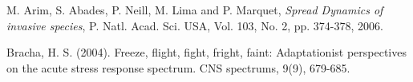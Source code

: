 \documentclass[10pt]{amsart}
\theoremstyle{definition}
\begin{document}
\begin{thebibliography}{}



M. Arim, S. Abades, P. Neill, M. Lima and P. Marquet,
\newblock \emph{Spread Dynamics of invasive species},
\newblock P. Natl. Acad. Sci. USA,
\newblock Vol. 103, No. 2, pp. 374-378, 2006.

%






Bracha, H. S. (2004). Freeze, flight, fight, fright, faint: Adaptationist perspectives on the acute stress response spectrum. CNS spectrums, 9(9), 679-685.





%
%


\end{thebibliography}
\end{document}
